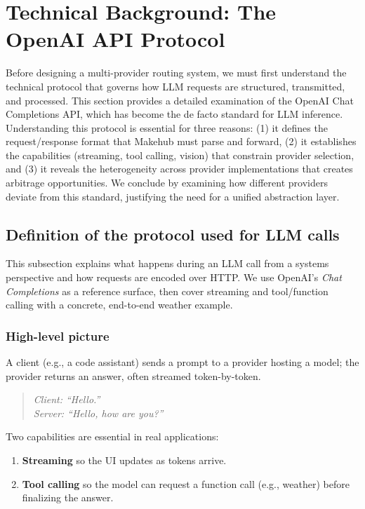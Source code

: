 \documentclass[english]{article}
\begin{document}

\newpage
\section{Technical Background: The OpenAI API Protocol}

Before designing a multi-provider routing system, we must first understand the technical protocol that governs how LLM requests are structured, transmitted, and processed. This section provides a detailed examination of the OpenAI Chat Completions API, which has become the de facto standard for LLM inference. Understanding this protocol is essential for three reasons: (1) it defines the request/response format that Makehub must parse and forward, (2) it establishes the capabilities (streaming, tool calling, vision) that constrain provider selection, and (3) it reveals the heterogeneity across provider implementations that creates arbitrage opportunities. We conclude by examining how different providers deviate from this standard, justifying the need for a unified abstraction layer.

\subsection{Definition of the protocol used for LLM calls}

This subsection explains what happens during an LLM call from a systems perspective and how requests are encoded over HTTP. We use OpenAI's \emph{Chat Completions} as a reference surface, then cover streaming and tool/function calling with a concrete, end-to-end weather example.

\subsubsection{High-level picture}

A client (e.g., a code assistant) sends a prompt to a provider hosting a model; the provider returns an answer, often streamed token-by-token.

\begin{quote}\itshape
Client: ``Hello.'' \\
Server: ``Hello, how are you?''
\end{quote}

Two capabilities are essential in real applications:
\begin{enumerate}
  \item \textbf{Streaming} so the UI updates as tokens arrive.
  \item \textbf{Tool calling} so the model can request a function call (e.g., weather) before finalizing the answer.
\end{enumerate}
\end{document}
